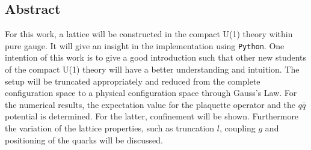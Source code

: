 \begin{strip}
	\section{Abstract}
  For this work, a lattice will be constructed in the compact U(1) theory within pure gauge. It will give an insight in the implementation using \texttt{Python}.
  One intention of this work is to give a good introduction such that other new students of the compact U(1) theory will have a better understanding and intuition. The setup will be truncated appropriately and reduced from the complete configuration space to a physical configuration space through Gauss's Law.
	For the numerical results, the expectation value for the plaquette operator and the $q\bar{q}$ potential is determined. For the latter, confinement will be shown. Furthermore the variation of the lattice properties, such as truncation $l$, coupling $g$ and positioning of the quarks will be discussed.
\end{strip}

